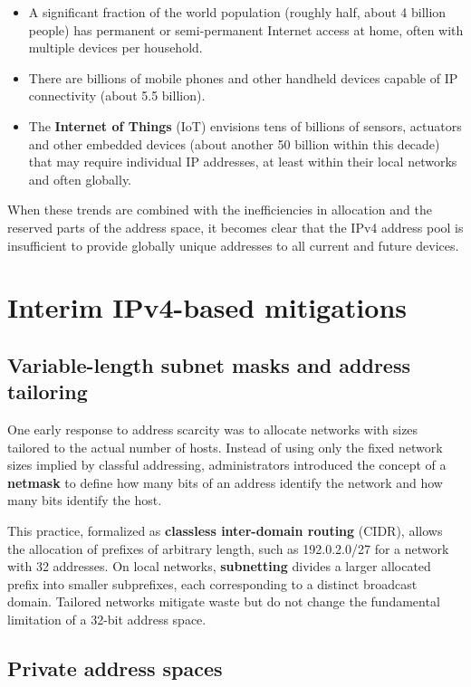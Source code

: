 \begin{itemize}
\item A significant fraction of the world population (roughly half, about 4
billion people) has permanent or semi-permanent Internet access at home,
often with multiple devices per household.
\item There are billions of mobile phones and other handheld devices capable of
IP connectivity (about 5.5 billion).
\item The \textbf{Internet of Things} (IoT) envisions tens of billions of
sensors, actuators and other embedded devices (about another 50 billion
within this decade) that may require individual IP addresses, at least
within their local networks and often globally.
\end{itemize}

When these trends are combined with the inefficiencies in allocation and the reserved parts of the address space, it becomes clear that the IPv4 address pool is insufficient to provide globally unique addresses to all current and future devices.

\section{Interim IPv4-based mitigations}

\subsection{Variable-length subnet masks and address tailoring}

One early response to address scarcity was to allocate networks with sizes tailored to the actual number of hosts. Instead of using only the fixed network sizes implied by classful addressing, administrators introduced the concept of a \textbf{netmask} to define how many bits of an address identify the network and how many bits identify the host.

This practice, formalized as \textbf{classless inter-domain routing} (CIDR), allows the allocation of prefixes of arbitrary length, such as 192.0.2.0/27 for a network with 32 addresses. On local networks, \textbf{subnetting} divides a larger allocated prefix into smaller subprefixes, each corresponding to a distinct broadcast domain. Tailored networks mitigate waste but do not change the fundamental limitation of a 32-bit address space.

\subsection{Private address spaces}

